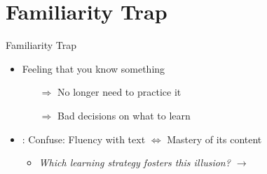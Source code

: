 \documentclass{ercisbeamer}
\begin{document}
\section{Familiarity Trap}
\begin{frame}{Familiarity Trap}
    \begin{tbox}
        \begin{itemize}
            \item Feeling that you know something
            \begin{itemize}
                \item[$\Rightarrow$] No longer need to practice it
                \item[$\Rightarrow$] Bad decisions on what to learn
            \end{itemize}
            
            \item {}: Confuse: Fluency with text $\Leftrightarrow$ Mastery of its content
            \begin{itemize}
                \item \emph{Which learning strategy fosters this illusion? \pause $\rightarrow$ }
            \end{itemize}
        \end{itemize}
    \end{tbox}
    
\end{frame}

\end{document}
